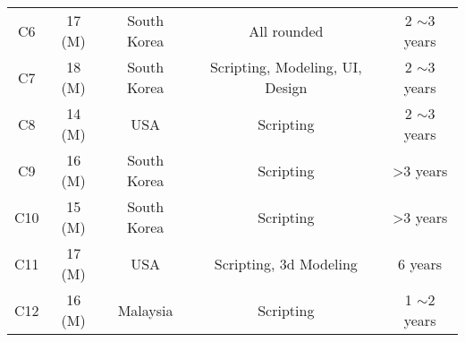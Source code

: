 \begin{table}[]
\begin{tabular}{|c|cccc|}
\rowcolor[HTML]{FFFFFF} 
C6                                                                 & 17 (M)                                                                                         & South Korea          & All rounded                                                                                 & 2 $\sim$3 years                                                               \\
\rowcolor[HTML]{FFFFFF} 
C7                                                                 & 18 (M)                                                                                         & South Korea          & Scripting, Modeling, UI, Design                                                             & 2 $\sim$3 years                                                               \\
\rowcolor[HTML]{FFFFFF} 
C8                                                                 & 14 (M)                                                                                         & USA                  & Scripting                                                                                   & 2 $\sim$3 years                                                               \\
\rowcolor[HTML]{FFFFFF} 
C9                                                                 & 16 (M)                                                                                         & South Korea          & Scripting                                                                                   & \textgreater 3 years                                                          \\
\rowcolor[HTML]{FFFFFF} 
C10                                                                & 15 (M)                                                                                         & South Korea          & Scripting                                                                                   & \textgreater 3 years                                                          \\
\rowcolor[HTML]{FFFFFF} 
C11                                                                & 17 (M)                                                                                         & USA                  & Scripting, 3d Modeling                                                                      & 6 years                                                                       \\
\rowcolor[HTML]{FFFFFF} 
C12                                                                & 16 (M)                                                                                         & Malaysia             & Scripting                                                                                   & 1 $\sim$2 years                                                               \\

\end{tabular}
\end{table}
